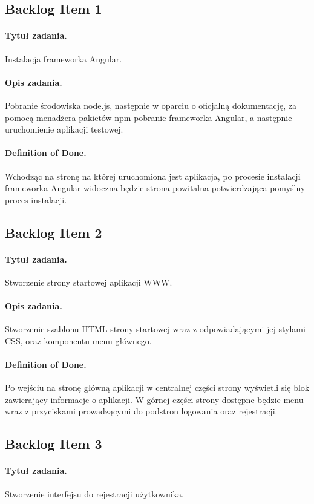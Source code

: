 ﻿\documentclass[a4paper]{article}
\begin{document}
\subsection{Backlog Item 1} 
\paragraph{Tytuł zadania.} Instalacja frameworka Angular.
\paragraph{Opis zadania.} Pobranie środowiska node.js, następnie w oparciu o oficjalną dokumentację, za pomocą menadżera pakietów npm pobranie frameworka Angular, a następnie uruchomienie aplikacji testowej. 
\paragraph{Definition of Done.} Wchodząc na stronę na której uruchomiona jest aplikacja, po procesie instalacji frameworka Angular widoczna będzie strona powitalna potwierdzająca pomyślny proces instalacji.

\subsection{Backlog Item 2}
\paragraph{Tytuł zadania.} Stworzenie strony startowej aplikacji WWW.
\paragraph{Opis zadania.} Stworzenie szablonu HTML strony startowej wraz z odpowiadającymi jej stylami CSS, oraz komponentu menu głównego.
\paragraph{Definition of Done.} Po wejściu na stronę główną aplikacji w centralnej części strony wyświetli się blok zawierający
informacje o aplikacji. W górnej części strony dostępne będzie menu wraz z przyciskami prowadzącymi do podstron logowania oraz rejestracji.

\subsection{Backlog Item 3} 
\paragraph{Tytuł zadania.} Stworzenie interfejsu do rejestracji użytkownika.
\end{document}
